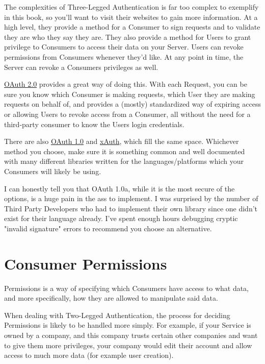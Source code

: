 \documentclass{book}
\begin{document}
The complexities of Three-Legged Authentication is far too complex to exemplify in this book, so you'll want to visit their websites to gain more information. At a high level, they provide a method for a Consumer to sign requests and to validate they are who they say they are. They also provide a method for Users to grant privilege to Consumers to access their data on your Server. Users can revoke permissions from Consumers whenever they'd like. At any point in time, the Server can revoke a Consumers privileges as well.

\href{https://tools.ietf.org/html/rfc6749}{OAuth 2.0} provides a great way of doing this. With each Request, you can be sure you know which Consumer is making requests, which User they are making requests on behalf of, and provides a (mostly) standardized way of expiring access or allowing Users to revoke access from a Consumer, all without the need for a third-party consumer to know the Users login credentials.

There are also \href{http://tools.ietf.org/html/rfc5849}{OAuth 1.0} and \href{https://dev.twitter.com/docs/oauth/xauth}{xAuth}, which fill the same space. Whichever method you choose, make sure it is something common and well documented with many different libraries written for the languages/platforms which your Consumers will likely be using.

I can honestly tell you that OAuth 1.0a, while it is the most secure of the options, is a huge pain in the ass to implement. I was surprised by the number of Third Party Developers who had to implement their own library since one didn't exist for their language already. I've spent enough hours debugging cryptic "invalid signature" errors to recommend you choose an alternative.


\section{Consumer Permissions}

Permissions is a way of specifying which Consumers have access to what data, and more specifically, how they are allowed to manipulate said data.

When dealing with Two-Legged Authentication, the process for deciding Permissions is likely to be handled more simply. For example, if your Service is owned by a company, and this company trusts certain other companies and want to give them more privileges, your company would edit their account and allow access to much more data (for example user creation).
\end{document}
